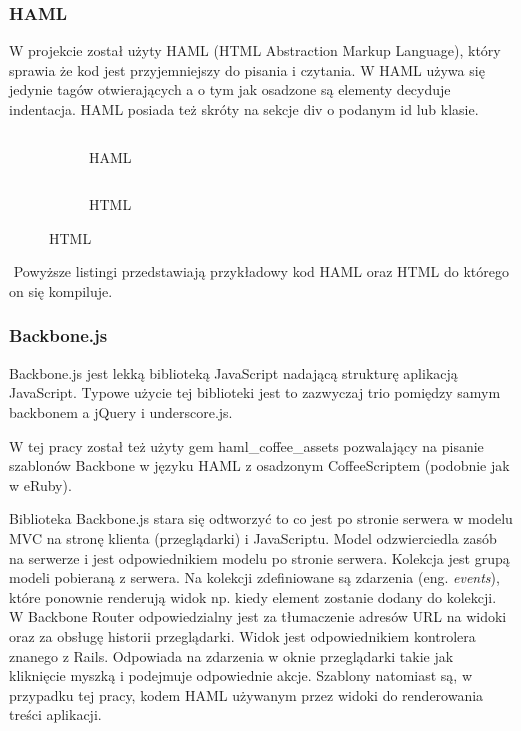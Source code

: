 \documentclass[11pt,a4paper, twoside]{article}
\begin{document}
\subsubsection{HAML}
W projekcie został użyty HAML (HTML Abstraction Markup Language), który sprawia że kod jest przyjemniejszy do pisania i czytania. W HAML używa się jedynie tagów otwierających a o tym jak osadzone są elementy decyduje indentacja. HAML posiada też skróty na sekcje div o podanym id lub klasie.
\begin{figure}[H]
\centering
\begin{subfigure}[t]{0.45\textwidth}
\caption{HAML}
\begin{listing}[H]
\inputminted[linenos=true]{haml}{./src/example.haml}
\end{listing}
\end{subfigure}
\begin{subfigure}[t]{0.45\textwidth}
\caption{HTML}
\begin{listing}[H]
\inputminted{html}{./src/example.html}
\end{listing}
\end{subfigure}
\end{figure}
$\label{haml}$
Powyższe listingi przedstawiają przykładowy kod HAML oraz HTML do którego on się kompiluje.
\subsubsection{Backbone.js}
Backbone.js jest lekką biblioteką JavaScript nadającą strukturę aplikacją JavaScript. Typowe użycie tej biblioteki jest to zazwyczaj trio pomiędzy samym backbonem a jQuery i underscore.js.

W tej pracy został też użyty gem haml\_coffee\_assets pozwalający na pisanie szablonów Backbone w języku HAML z osadzonym CoffeeScriptem (podobnie jak w eRuby). 

Biblioteka Backbone.js stara się odtworzyć to co jest po stronie serwera w modelu MVC na stronę klienta (przeglądarki) i JavaScriptu. Model odzwierciedla zasób na serwerze i jest odpowiednikiem modelu po stronie serwera. Kolekcja jest grupą modeli pobieraną z serwera. Na kolekcji zdefiniowane są zdarzenia (eng. \emph{events}), które ponownie renderują widok np. kiedy element zostanie dodany do kolekcji. W Backbone Router odpowiedzialny jest za tłumaczenie adresów URL na widoki oraz za obsługę historii przeglądarki. Widok jest odpowiednikiem kontrolera znanego z Rails. Odpowiada na zdarzenia w oknie przeglądarki takie jak kliknięcie myszką i podejmuje odpowiednie akcje. Szablony natomiast są, w przypadku tej pracy, kodem HAML używanym przez widoki do renderowania treści aplikacji.
\end{document}
